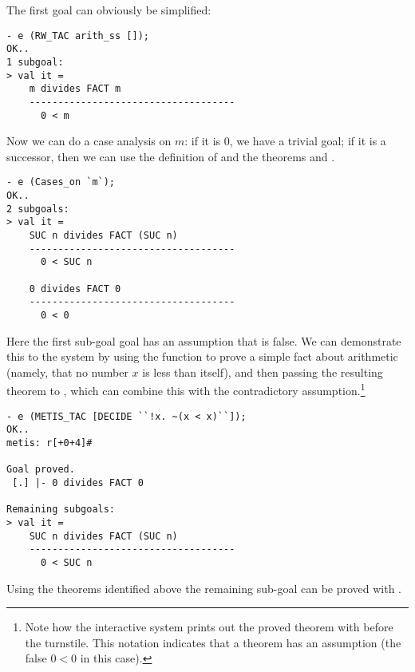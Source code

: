 \noindent The first goal can obviously be simplified:
\begin{session}
\begin{verbatim}
- e (RW_TAC arith_ss []);
OK..
1 subgoal:
> val it =
    m divides FACT m
    ------------------------------------
      0 < m
\end{verbatim}
\end{session}
\noindent Now we can do a case analysis on $m$: if it is $0$, we have a
trivial goal; if it is a successor, then we can use the definition of
 and the theorems  and
.
\begin{session}
\begin{verbatim}
- e (Cases_on `m`);
OK..
2 subgoals:
> val it =
    SUC n divides FACT (SUC n)
    ------------------------------------
      0 < SUC n

    0 divides FACT 0
    ------------------------------------
      0 < 0
\end{verbatim}
\end{session}

 Here the first sub-goal goal has an assumption that is false.  We
 can demonstrate this to the system by using the 
function to prove a simple fact about arithmetic (namely, that no
number $x$ is less than itself), and then passing the resulting
theorem to , which can combine this with the
contradictory assumption.\footnote{Note how the interactive system
  prints out the proved theorem with \ml{[.]} before the
  turnstile.  This notation indicates that a theorem has an
 assumption (the false $0 < 0$ in this case).}

\begin{session}
\begin{verbatim}
- e (METIS_TAC [DECIDE ``!x. ~(x < x)``]);
OK..
metis: r[+0+4]#

Goal proved.
 [.] |- 0 divides FACT 0

Remaining subgoals:
> val it =
    SUC n divides FACT (SUC n)
    ------------------------------------
      0 < SUC n
\end{verbatim}
\end{session}
Using the theorems identified above the remaining sub-goal can
be proved with .

